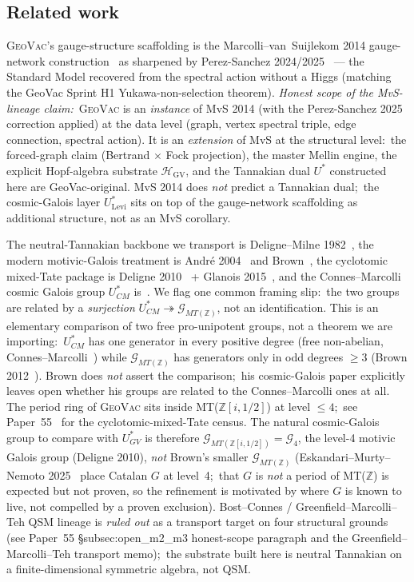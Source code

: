 \documentclass[11pt,a4paper]{article}
\theoremstyle{plain}
\theoremstyle{definition}
\newcommand{\HGV}{\mathcal{H}_{\mathrm{GV}}}
\newcommand{\Z}{\mathbb{Z}}
\newcommand{\Ulev}{U^{*}_{\mathrm{Levi}}}
\begin{document}
\subsection{Related work}\label{sec:related}

\textsc{GeoVac}'s gauge-structure scaffolding is the
Marcolli--van~Suijlekom 2014 gauge-network
construction~\cite{marcolli_vs2014} as sharpened by
Perez-Sanchez 2024/2025~\cite{perez_sanchez2024,perez_sanchez2025} ---
the Standard Model recovered from the spectral action without a
Higgs (matching the GeoVac Sprint H1 Yukawa-non-selection theorem).
\emph{Honest scope of the MvS-lineage claim:}\ \textsc{GeoVac} is an
\emph{instance} of MvS 2014 (with the Perez-Sanchez 2025 correction
applied) at the data level (graph, vertex spectral triple, edge
connection, spectral action). It is an \emph{extension} of MvS at
the structural level:\ the forced-graph claim (Bertrand $\times$
Fock projection), the master Mellin engine, the explicit
Hopf-algebra substrate $\HGV$, and the Tannakian dual $U^*$
constructed here are GeoVac-original. MvS 2014 does \emph{not}
predict a Tannakian dual;\ the cosmic-Galois layer $\Ulev$ sits on
top of the gauge-network scaffolding as additional structure, not
as an MvS corollary.

The neutral-Tannakian backbone we transport is Deligne--Milne
1982~\cite{deligne_milne1982}, the modern motivic-Galois treatment is
Andr\'e 2004~\cite{andre2004} and Brown~\cite{brown2017}, the
cyclotomic mixed-Tate package is Deligne 2010~\cite{deligne2010} +
Glanois 2015~\cite{glanois2015}, and the Connes--Marcolli cosmic
Galois group $U^*_{CM}$ is~\cite{connes_marcolli2004}. We flag one
common framing slip:\ the two groups are related by a \emph{surjection}
$U^*_{CM} \twoheadrightarrow \mathcal{G}_{MT(\Z)}$, not an identification.
This is an elementary comparison of two free pro-unipotent groups, not a
theorem we are importing:\ $U^*_{CM}$ has one generator in every positive
degree (free non-abelian, Connes--Marcolli~\cite{connes_marcolli2004}) while
$\mathcal{G}_{MT(\Z)}$ has generators only in odd degrees $\ge 3$ (Brown
2012~\cite{brown2017}).  Brown does \emph{not} assert the comparison;\ his
cosmic-Galois paper explicitly leaves open whether his groups are related
to the Connes--Marcolli ones at all. The period ring of
\textsc{GeoVac} sits inside MT($\Z[i, 1/2]$) at level $\le 4$;\ see
Paper~55~\cite{paper55} for the cyclotomic-mixed-Tate census.
The natural cosmic-Galois group to compare with $U^*_{GV}$ is
therefore $\mathcal{G}_{MT(\Z[i, 1/2])} = \mathcal{G}_4$, the level-4
motivic Galois group (Deligne 2010), \emph{not} Brown's smaller
$\mathcal{G}_{MT(\Z)}$ (Eskandari--Murty--Nemoto
2025~\cite{eskandari_murty_nemoto2025} place Catalan $G$ at level~4;\ that
$G$ is \emph{not} a period of MT($\Z$) is expected but not proven, so the
refinement is motivated by where $G$ is known to live, not compelled by a
proven exclusion).
Bost--Connes / Greenfield--Marcolli--Teh QSM lineage is \emph{ruled
out} as a transport target on four structural grounds (see Paper~55
§subsec:open\_m2\_m3 honest-scope paragraph and the
Greenfield--Marcolli--Teh transport memo);\ the substrate built here
is neutral Tannakian on a finite-dimensional symmetric algebra, not
QSM.
\end{document}
